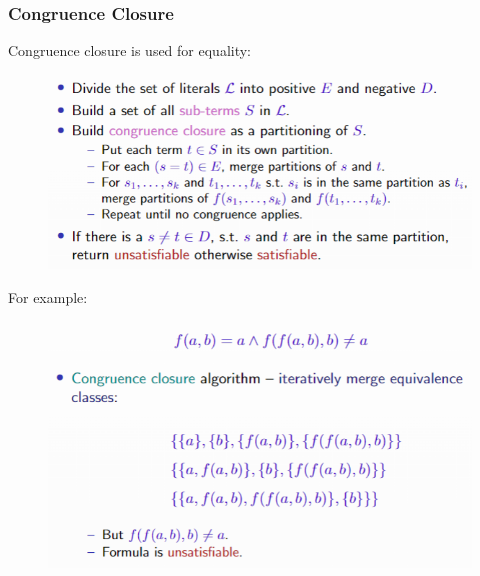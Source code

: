 \documentclass[10pt,a4paper]{report}
\begin{document}
\subsubsection{Congruence Closure}
Congruence closure is used for equality:
\begin{figure}[H]
    \centering
    \includegraphics[scale=0.5]{32.png}
\end{figure}
For example:
\begin{figure}[H]
    \centering
    \includegraphics[scale=0.5]{33.png}
\end{figure}
\end{document}
